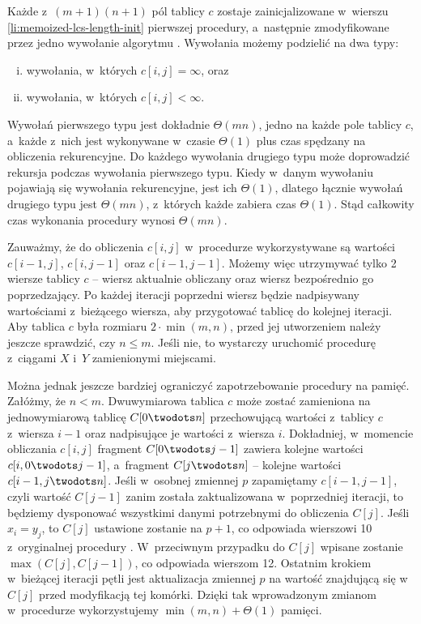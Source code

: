 Każde z~$(m+1)(n+1)$ pól tablicy $c$ zostaje zainicjalizowane w~wierszu \ref{li:memoized-lcs-length-init} pierwszej procedury, a~następnie zmodyfikowane przez jedno wywołanie algorytmu .
Wywołania  możemy podzielić na dwa typy:
\begin{enumerate}[(i)]
	\item wywołania, w~których $c[i,j]=\infty$, oraz
	\item wywołania, w~których $c[i,j]<\infty$.
\end{enumerate}
Wywołań pierwszego typu jest dokładnie $\Theta(mn)$, jedno na każde pole tablicy $c$, a~każde z~nich jest wykonywane w~czasie $\Theta(1)$ plus czas spędzany na obliczenia rekurencyjne.
Do każdego wywołania drugiego typu może doprowadzić rekursja podczas wywołania pierwszego typu.
Kiedy w~danym wywołaniu  pojawiają się wywołania rekurencyjne, jest ich $\Theta(1)$, dlatego łącznie wywołań drugiego typu jest $\Theta(mn)$, z~których każde zabiera czas $\Theta(1)$.
Stąd całkowity czas wykonania procedury  wynosi $\Theta(mn)$.

\exercise %
Zauważmy, że do obliczenia $c[i,j]$ w~procedurze  wykorzystywane są wartości $c[i-1,j]$, $c[i,j-1]$ oraz $c[i-1,j-1]$.
Możemy więc utrzymywać tylko 2 wiersze tablicy $c$ -- wiersz aktualnie obliczany oraz wiersz bezpośrednio go poprzedzający.
Po każdej iteracji poprzedni wiersz będzie nadpisywany wartościami z~bieżącego wiersza, aby przygotować tablicę do kolejnej iteracji.
Aby tablica $c$ była rozmiaru $2\cdot\min(m,n)$, przed jej utworzeniem należy jeszcze sprawdzić, czy $n\le m$.
Jeśli nie, to wystarczy uruchomić procedurę z~ciągami $X$ i~$Y$ zamienionymi miejscami.

Można jednak jeszcze bardziej ograniczyć zapotrzebowanie procedury na pamięć.
Załóżmy, że $n<m$.
Dwuwymiarowa tablica $c$ może zostać zamieniona na jednowymiarową tablicę $C[0\twodots n]$ przechowującą wartości z~tablicy $c$ z~wiersza $i-1$ oraz nadpisujące je wartości z~wiersza $i$.
Dokładniej, w~momencie obliczania $c[i,j]$ fragment $C[0\twodots j-1]$ zawiera kolejne wartości $c[i,0\twodots j-1]$, a~fragment $C[j\twodots n]$ -- kolejne wartości $c[i-1,j\twodots n]$.
Jeśli w~osobnej zmiennej $p$ zapamiętamy $c[i-1,j-1]$, czyli wartość $C[j-1]$ zanim została zaktualizowana w~poprzedniej iteracji, to będziemy dysponować wszystkimi danymi potrzebnymi do obliczenia $C[j]$.
Jeśli $x_i=y_j$, to $C[j]$ ustawione zostanie na $p+1$, co odpowiada wierszowi 10 z~oryginalnej procedury .
W~przeciwnym przypadku do $C[j]$ wpisane zostanie $\max(C[j],C[j-1])$, co odpowiada wierszom 12.
Ostatnim krokiem w~bieżącej iteracji pętli jest aktualizacja zmiennej $p$ na wartość znajdującą się w~$C[j]$ przed modyfikacją tej komórki.
Dzięki tak wprowadzonym zmianom w~procedurze wykorzystujemy $\min(m,n)+\Theta(1)$ pamięci.

